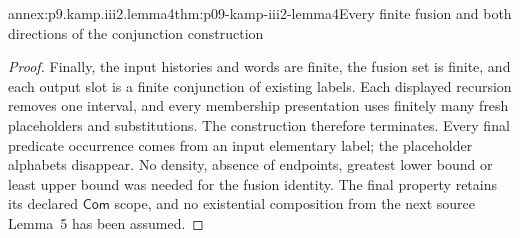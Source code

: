 \begin{annexitem}{annex:p9.kamp.iii2.lemma4}{thm:p09-kamp-iii2-lemma4}{Every finite fusion and both directions of the conjunction construction}
\begin{proof}
Finally, the input histories and words are finite, the fusion set is
finite, and each output slot is a finite conjunction of existing labels.
Each displayed recursion removes one interval, and every membership
presentation uses finitely many fresh placeholders and substitutions.
The construction therefore terminates. Every final predicate occurrence
comes from an input elementary label; the placeholder alphabets disappear.
No density, absence of endpoints, greatest lower bound or least upper
bound was needed for the fusion identity. The final property retains
its declared \(\mathsf{Com}\) scope, and no existential composition
from the next source Lemma~5 has been assumed.
\end{proof}
\end{annexitem}
